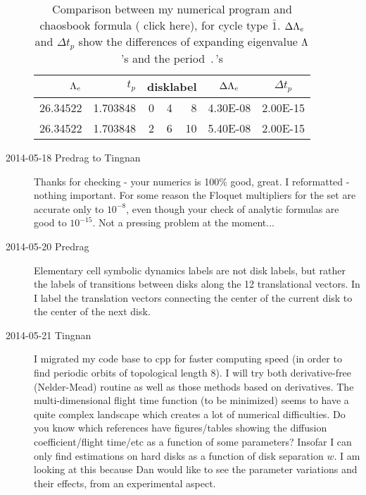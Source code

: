 \begin{description}
\begin{table}[htbp]
  \centering
  \caption{Comparison between my numerical program and chaosbook formula  (
    {click here}), for cycle type $\bar{1}$. $\Delta\Lambda_e$ and $\Delta t_p$ show the differences of expanding eigenvalue $\Lambda$'s and  the period $\period{}$'s}
    \begin{tabular}{|r|r|rrr|r|r|}
    \hline
        $\Lambda_e$ & $t_p$    & \multicolumn{3}{c|}{disklabel} &\multicolumn{1}{c|}{ $\Delta\Lambda_e$} & \multicolumn{1}{c|}{$\Delta t_p$} \\\hline
    26.34522 & 1.703848 & 0     & 4     & 8     & 4.30E-08 & 2.00E-15 \\
    26.34522 & 1.703848 & 2     & 6     & 10    & 5.40E-08 & 2.00E-15 \\
	\hline
    \end{tabular}%
  \label{tab:comparison1}%
\end{table}%


\item[2014-05-18 Predrag to Tingnan] Thanks for checking - your
    numerics is 100\% good, great. I reformatted
     - nothing important. For some reason the
    Floquet multipliers for the  set are accurate only to
    $10^{-8}$, even though your check of analytic formulas are good to
    $10^{-15}$. Not a pressing problem at the moment...

\item[2014-05-20 Predrag]
Elementary cell symbolic dynamics labels are not disk labels, but rather
the labels of transitions between disks along the 12 translational
vectors. In  I label the
translation vectors connecting the center of the current disk to the
center of the next disk.

\item[2014-05-21 Tingnan]
I migrated my code base to cpp for
faster computing speed (in order to find periodic orbits of topological
length 8). I will try both derivative-free (Nelder-Mead) routine as well
as those methods based on derivatives. The multi-dimensional flight time
function (to be minimized) seems to have a quite complex landscape which
creates a lot of numerical difficulties. Do you know which references
have figures/tables showing the diffusion coefficient/flight time/etc as
a function of some parameters? Insofar I can only find estimations on
hard disks as a function of disk separation $w$. I am looking at this
because Dan would like to see the parameter variations and their effects,
from an experimental aspect.


\end{description}
